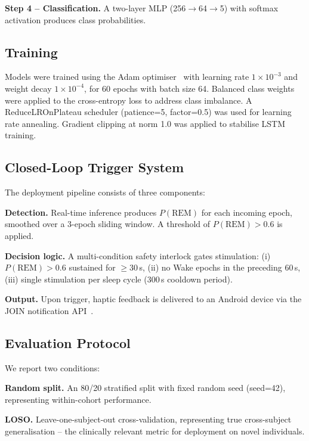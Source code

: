 \documentclass[journal]{IEEEtran}
\begin{document}
\textbf{Step 4 -- Classification.}
A two-layer MLP (256$\rightarrow$64$\rightarrow$5)
with softmax activation produces class probabilities.

\subsection{Training}

Models were trained using the Adam
optimiser~\cite{kingma2014} with learning rate
$1 \times 10^{-3}$ and weight decay
$1 \times 10^{-4}$, for 60 epochs with batch size 64.
Balanced class weights were applied to the
cross-entropy loss to address class imbalance.
A ReduceLROnPlateau scheduler (patience=5, factor=0.5)
was used for learning rate annealing.
Gradient clipping at norm 1.0 was applied to
stabilise LSTM training.

\subsection{Closed-Loop Trigger System}

The deployment pipeline consists of three components:

\textbf{Detection.}
Real-time inference produces $P(\text{REM})$ for each
incoming epoch, smoothed over a 3-epoch sliding window.
A threshold of $P(\text{REM}) > 0.6$ is applied.

\textbf{Decision logic.}
A multi-condition safety interlock gates stimulation:
(i) $P(\text{REM}) > 0.6$ sustained for $\geq$30\,s,
(ii) no Wake epochs in the preceding 60\,s,
(iii) single stimulation per sleep cycle
(300\,s cooldown period).

\textbf{Output.}
Upon trigger, haptic feedback is delivered to
an Android device via the JOIN notification
API~\cite{join2023}.

\subsection{Evaluation Protocol}

We report two conditions:

\textbf{Random split.}
An 80/20 stratified split with fixed random seed
(seed=42), representing within-cohort performance.

\textbf{LOSO.}
Leave-one-subject-out cross-validation, representing
true cross-subject generalisation -- the clinically
relevant metric for deployment on novel individuals.

\end{document}
